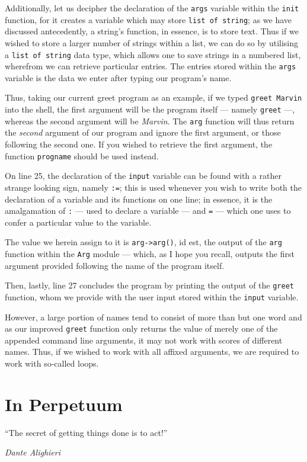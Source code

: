 \documentclass[a5paper,twoside,12pt]{report}
\begin{document}
Additionally, let us decipher the declaration of the \texttt{args} variable within the \texttt{init} function, for it creates a variable which may store \texttt{list of string}; as we have discussed antecedently, a string's function, in essence, is to store text. Thus if we wished to store a larger number of strings within a list, we can do so by utilising a \texttt{list of string} data type, which allows one to save strings in a numbered list, wherefrom we can retrieve particular entries. The entries stored within the \texttt{args} variable is the data we enter after typing our program's name.

Thus, taking our current greet program as an example, if we typed \texttt{greet Marvin} into the shell, the first argument will be the program itself — namely \texttt{greet} —, whereas the second argument will be \textit{Marvin}. The \texttt{arg} function will thus return the \textit{second} argument of our program and ignore the first argument, or those following the second one. If you wished to retrieve the first argument, the function \texttt{progname} should be used instead.

On line 25, the declaration of the \texttt{input} variable can be found with a rather strange looking sign, namely \texttt{:=}; this is used whenever you wish to write both the declaration of a variable and its functions on one line; in essence, it is the amalgamation of \texttt{:} — used to declare a variable — and \texttt{=} — which one uses to confer a particular value to the variable.

The value we herein assign to it is \texttt{arg->arg()}, id est, the output of the \texttt{arg} function within the \texttt{Arg} module — which, as I hope you recall, outputs the first argument provided following the name of the program itself. 

Then, lastly, line 27 concludes the program by printing the output of the \texttt{greet} function, whom we provide with the user input stored within the \texttt{input} variable. 

However, a large portion of names tend to consist of more than but one word and as our improved \texttt{greet} function only returns the value of merely one of the appended command line arguments, it may not work with scores of different names. Thus, if we wished to work with all affixed arguments, we are required to work with so-called loops. 

\chapter*{In Perpetuum}
\epigraph{``The secret of getting things done is to act!''}{\textit{Dante Alighieri}}
\end{document}
